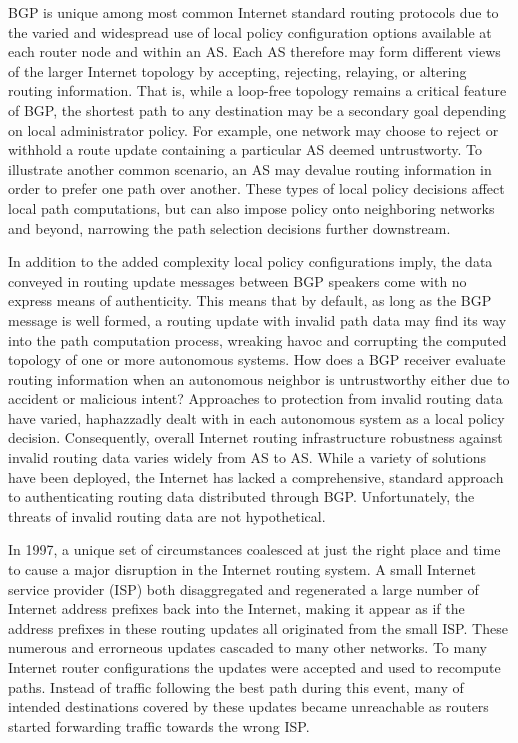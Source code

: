 \documentclass[sigconf]{acmart}
\begin{document}
BGP is unique among most common Internet standard routing protocols due
to the varied and widespread use of local policy configuration options
available at each router node and within an AS.  Each AS therefore may
form different views of the larger Internet topology by accepting,
rejecting, relaying, or altering routing information.  That is, while a
loop-free topology remains a critical feature of BGP, the shortest path
to any destination may be a secondary goal depending on local
administrator policy.  For example, one network may choose to reject or
withhold a route update containing a particular AS deemed untrustworty.
To illustrate another common scenario, an AS may devalue routing
information in order to prefer one path over another.  These types of
local policy decisions affect local path computations, but can also
impose policy onto neighboring networks and beyond, narrowing the path
selection decisions further downstream.

In addition to the added complexity local policy configurations imply,
the data conveyed in routing update messages between BGP speakers come
with no express means of authenticity.  This means that by default, as
long as the BGP message is well formed, a routing update with invalid
path data may find its way into the path computation process, wreaking
havoc and corrupting the computed topology of one or more autonomous
systems.  How does a BGP receiver evaluate routing information when an
autonomous neighbor is untrustworthy either due to accident or malicious
intent?  Approaches to protection from invalid routing data have varied,
haphazzadly dealt with in each autonomous system as a local policy
decision.  Consequently, overall Internet routing infrastructure
robustness against invalid routing data varies widely from AS to AS.
While a variety of solutions have been deployed, the Internet has lacked
a comprehensive, standard approach to authenticating routing data
distributed through BGP.  Unfortunately, the threats of invalid routing
data are not hypothetical.

In 1997, a unique set of circumstances coalesced at just the right place
and time to cause a major disruption in the Internet routing
system.\cite{barret_routing_1997}  A small Internet service provider
(ISP) both disaggregated and regenerated a large number of Internet
address prefixes back into the Internet, making it appear as if the
address prefixes in these routing updates all originated from the small
ISP.  These numerous and errorneous updates cascaded to many other
networks.  To many Internet router configurations the updates were
accepted and used to recompute paths.  Instead of traffic following the
best path during this event, many of intended destinations covered by
these updates became unreachable as routers started forwarding traffic
towards the wrong ISP.
\end{document}
